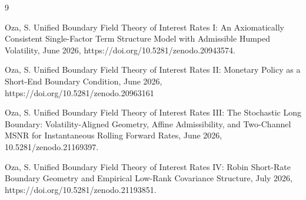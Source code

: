 \documentclass[11pt]{article}
\begin{document}
\begin{thebibliography}{9}

Oza, S. Unified Boundary Field Theory of Interest Rates I: An Axiomatically Consistent Single-Factor Term Structure Model with Admissible Humped Volatility, June 2026, https://doi.org/10.5281/zenodo.20943574.

Oza, S. Unified Boundary Field Theory of Interest Rates II: Monetary Policy as a Short-End Boundary Condition, June 2026, https://doi.org/10.5281/zenodo.20963161

Oza, S. Unified Boundary Field Theory of Interest Rates III: The Stochastic Long Boundary: Volatility-Aligned Geometry, Affine Admissibility, and Two-Channel MSNR for Instantaneous Rolling Forward Rates, June 2026, 10.5281/zenodo.21169397.

Oza, S. Unified Boundary Field Theory of Interest Rates IV: Robin Short-Rate Boundary Geometry and Empirical Low-Rank Covariance Structure, July 2026, https://doi.org/10.5281/zenodo.21193851.

\end{thebibliography}
\end{document}
